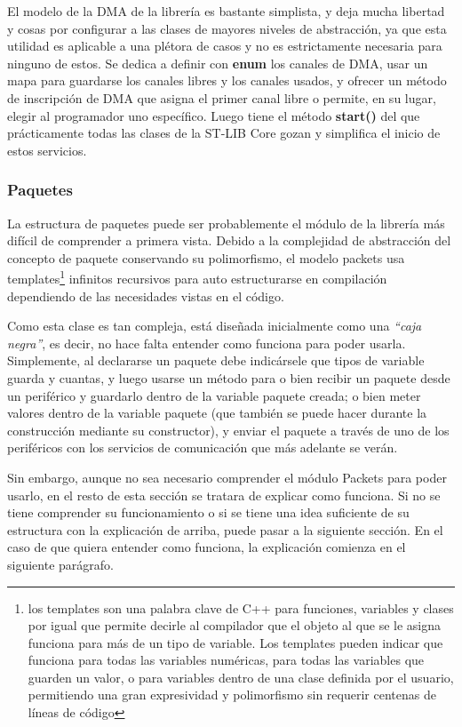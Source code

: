 \documentclass{report}
\begin{document}
El modelo de la DMA de la librería es bastante simplista, y deja mucha libertad y cosas por configurar a las clases de mayores niveles de abstracción, ya que esta utilidad es aplicable a una plétora de casos y no es estrictamente necesaria para ninguno de estos. Se dedica a definir con \textbf{enum} los canales de DMA, usar un mapa para guardarse los canales libres y los canales usados, y ofrecer un método de inscripción de DMA que asigna el primer canal libre o permite, en su lugar, elegir al programador uno específico. Luego tiene el método \textbf{start()} del que prácticamente todas las clases de la ST-LIB Core gozan y simplifica el inicio de estos servicios. 

\subsubsection{Paquetes}
La estructura de paquetes puede ser probablemente el módulo de la librería más difícil de comprender a primera vista. Debido a la complejidad de abstracción del concepto de paquete conservando su polimorfismo, el modelo packets usa templates\footnote{los templates son una palabra clave de C++ para funciones, variables y clases por igual que permite decirle al compilador que el objeto al que se le asigna funciona para más de un tipo de variable. Los templates pueden indicar que funciona para todas las variables numéricas, para todas las variables que guarden un valor, o para variables dentro de una clase definida por el usuario, permitiendo una gran expresividad y polimorfismo sin requerir centenas de líneas de código} infinitos recursivos para auto estructurarse en compilación dependiendo de las necesidades vistas en el código. 
\par \vspace{0.3 cm}
Como esta clase es tan compleja, está diseñada inicialmente como una \textit{``caja negra''}, es decir, no hace falta entender como funciona para poder usarla. Simplemente, al declararse un paquete debe indicársele que tipos de variable guarda y cuantas, y luego usarse un método para o bien recibir un paquete desde un periférico y guardarlo dentro de la variable paquete creada; o bien meter valores dentro de la variable paquete (que también se puede hacer durante la construcción mediante su constructor), y enviar el paquete a través de uno de los periféricos con los servicios de comunicación que más adelante se verán. 
\par \vspace{0.3 cm}
Sin embargo, aunque no sea necesario comprender el módulo Packets para poder usarlo, en el resto de esta sección se tratara de explicar como funciona. Si no se tiene comprender su funcionamiento o si se tiene una idea suficiente de su estructura con la explicación de arriba, puede pasar a la siguiente sección. En el caso de que quiera entender como funciona, la explicación comienza en el siguiente parágrafo. 
\end{document}

